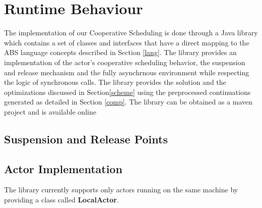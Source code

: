 \section{Runtime Behaviour}
\label{run}
The implementation of our Cooperative Scheduling is done through a Java library which contains a set of classes and interfaces that have a direct mapping to the ABS language concepts described in Section \ref{lang}. The library provides an implementation of the actor's cooperative scheduling behavior, the suspension and release mechanism and the fully asynchrnous environment while respecting the logic of synchronous calls. The library provides the solution and the optimizations discussed in Section\ref{scheme} using the preprocessed continuations generated as detailed in Section \ref{comp}. The library can be obtained as a maven project and is available online\cite{library}

\subsection{Suspension and Release Points}


\subsection{Actor Implementation}
The library currently supports only actors running on the same machine by providing a class called \textbf{LocalActor}. 

